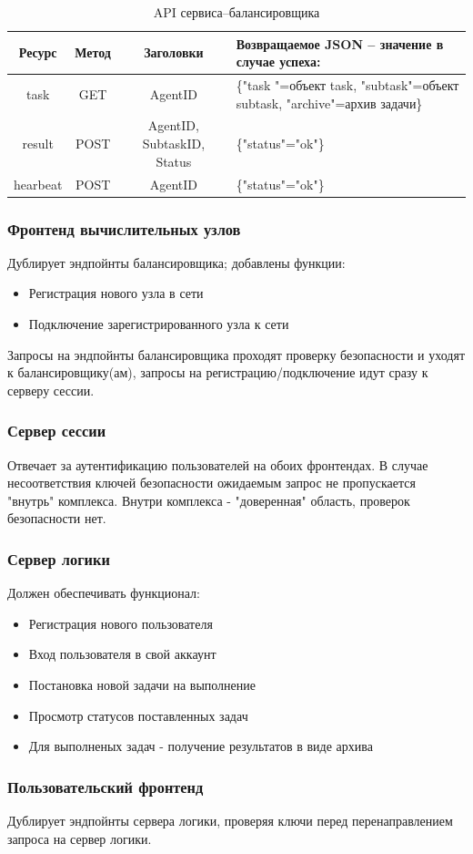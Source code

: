 \documentclass[a4paper,12pt]{report}
\numberwithin{equation}{section}
\begin{document}
\begin{table}[h]
    \caption{API сервиса--балансировщика}
    \label{tab:balance-api}
    \begin{tabu}{|c|c|c|X[c]|}
    	\hline
    	 Ресурс  & Метод &         Заголовки          & Возвращаемое JSON -- значение в случае успеха:                          \\ \hline
    	  task   &  GET  &          AgentID           & \{"task "=объект task, "subtask"=объект subtask, "archive"=архив задачи\} \\ \hline
    	 result  & POST  & AgentID, SubtaskID, Status & \{"status"="ok"\}                                                         \\ \hline
    	hearbeat & POST  &          AgentID           & \{"status"="ok"\}                                                         \\ \hline
    \end{tabu}
\end{table}

\subsubsection{Фронтенд вычислительных узлов}
Дублирует эндпойнты балансировщика; добавлены функции:
\begin{itemize}
  \item Регистрация нового узла в сети
  \item Подключение зарегистрированного узла к сети
\end{itemize}
Запросы на эндпойнты балансировщика проходят проверку безопасности и уходят к балансировщику(ам), запросы на регистрацию/подключение идут сразу к серверу сессии.

\subsubsection{Сервер сессии}
Отвечает за аутентификацию пользователей на обоих фронтендах. 
В случае несоответствия ключей безопасности ожидаемым запрос не пропускается "внутрь" комплекса.
Внутри комплекса - "доверенная" область, проверок безопасности нет.

\subsubsection{Сервер логики}
Должен обеспечивать функционал:
\begin{itemize}
  \item Регистрация нового пользователя
  \item Вход пользователя в свой аккаунт
  \item Постановка новой задачи на выполнение
  \item Просмотр статусов поставленных задач
  \item Для выполненых задач - получение результатов в виде архива
\end{itemize}

\subsubsection{Пользовательский фронтенд}
Дублирует эндпойнты сервера логики, проверяя ключи перед перенаправлением запроса на сервер логики.
\end{document}
